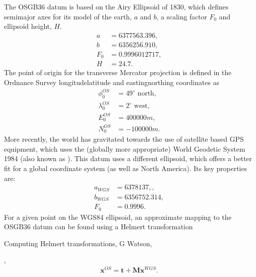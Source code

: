 \documentclass[letterpaper,10pt,english]{sphinxmanual}
\begin{document}
\sphinxAtStartPar
The OSGB36 datum is based on the Airy Ellipsoid of 1830, which defines
semimajor axes for its model of the earth, \(a\) and \(b\), a scaling
factor \(F_0\) and ellipsoid height, \(H\).
\begin{equation*}
\begin{split}a &= 6377563.396, \\
b &= 6356256.910, \\
F_0 &= 0.9996012717, \\
H &= 24.7.\end{split}
\end{equation*}
\sphinxAtStartPar
The point of origin for the transverse Mercator projection is defined in the
Ordnance Survey longitude\sphinxhyphen{}latitude and easting\sphinxhyphen{}northing coordinates as
\begin{equation*}
\begin{split}\phi^{OS}_0 &= 49^\circ \mbox{ north}, \\
\lambda^{OS}_0 &= 2^\circ \mbox{ west}, \\
E^{OS}_0 &= 400000 m, \\
N^{OS}_0 &= -100000 m.\end{split}
\end{equation*}
\sphinxAtStartPar
More recently, the world has gravitated towards the use of satellite based GPS
equipment, which uses the (globally more appropriate) World Geodetic System
1984 (also known as ). This datum uses a different ellipsoid, which offers a
better fit for a global coordinate system (as well as North America). Its key
properties are:
\begin{equation*}
\begin{split}a_{WGS} &= 6378137,, \\
b_{WGS} &= 6356752.314, \\
F_0 &= 0.9996.\end{split}
\end{equation*}
\sphinxAtStartPar
For a given point on the WGS84 ellipsoid, an approximate mapping to the
OSGB36 datum can be found using a Helmert transformation \sphinxstepexplicit %
\begin{footnote}[3]\label{\thesphinxscope.3}%
\sphinxAtStartFootnote
Computing Helmert transformations, G Watson, 
%
\end{footnote},
\begin{equation*}
\begin{split}\mathbf{x}^{OS} = \mathbf{t}+\mathbf{M}\mathbf{x}^{WGS}.\end{split}
\end{equation*}
\end{document}
